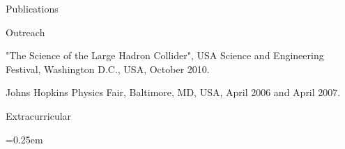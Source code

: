 \begin{small}
\begin{cvlist}{Publications}
\begin{itemize}
	\end{itemize}
\end{cvlist}

\begin{cvlist}{Outreach}
\item
	\item "The Science of the Large Hadron Collider", USA Science and Engineering Festival, Washington D.C., USA, October 2010.
	\item Johns Hopkins Physics Fair, Baltimore, MD, USA, April 2006 and April 2007.
\end{cvlist}

\begin{cvlist}{Extracurricular}
\item
\begin{itemize}\itemsep=0.25em
\end{itemize}
\end{cvlist}


\setlength{\cvlabelwidth}{\oldcvlabelwidth}
\setlength{\cvlabelsep}{\oldcvlabelsep}
\end{small}
